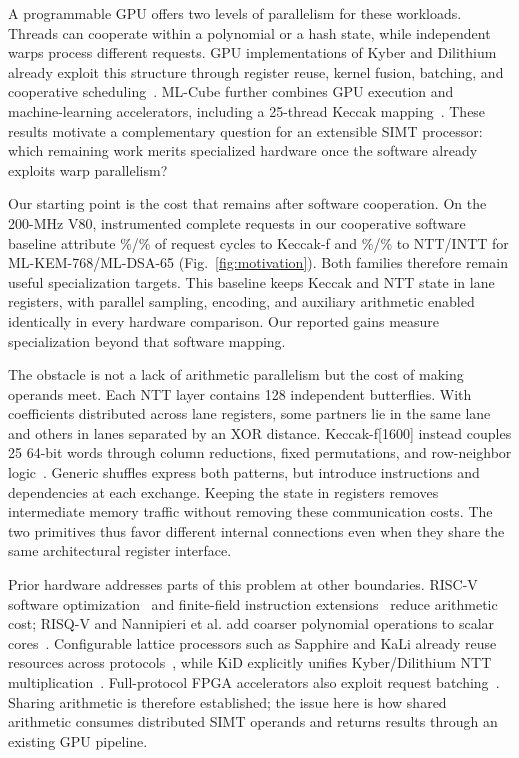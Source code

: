 \documentclass[conference,letterpaper]{IEEEtran}
\begin{document}
A programmable GPU offers two levels of parallelism for these workloads.
Threads can cooperate within a polynomial or a hash state, while independent
warps process different requests. GPU implementations of Kyber and Dilithium
already exploit this structure through register reuse, kernel fusion,
batching, and cooperative scheduling~\cite{hikyber,cudilithium}. ML-Cube
further combines GPU execution and machine-learning accelerators, including
a 25-thread Keccak mapping~\cite{mlcube}. These results motivate a complementary
question for an extensible SIMT processor: which remaining work merits
specialized hardware once the software already exploits warp parallelism?

Our starting point is the cost that remains after software cooperation.
On the 200-MHz V80, instrumented complete requests in our cooperative
software baseline attribute \MotivationKemKeccak{}\%/\MotivationDsaKeccak{}\%
of request cycles to Keccak-f and \MotivationKemNtt{}\%/\MotivationDsaNtt{}\% to NTT/INTT for
ML-KEM-768/ML-DSA-65 (Fig.~\ref{fig:motivation}). Both families therefore
remain useful specialization targets. This baseline keeps Keccak and NTT
state in lane registers, with parallel sampling, encoding, and auxiliary
arithmetic enabled identically in every hardware comparison. Our reported
gains measure specialization beyond that software mapping.

The obstacle is not a lack of arithmetic parallelism but the cost of making
operands meet. Each NTT layer contains 128 independent butterflies. With
coefficients distributed across lane registers, some partners lie in the same
lane and others in lanes separated by an XOR distance. Keccak-f[1600] instead
couples 25 64-bit words through column reductions, fixed permutations, and
row-neighbor logic~\cite{fips202}. Generic shuffles express both patterns, but
introduce instructions and dependencies at each exchange. Keeping the state
in registers removes intermediate memory traffic without removing these
communication costs. The two primitives thus favor different internal
connections even when they share the same architectural register interface.

Prior hardware addresses parts of this problem at other boundaries.
RISC-V software optimization~\cite{pqrv} and finite-field instruction
extensions~\cite{alkim,bevin} reduce arithmetic cost; RISQ-V and Nannipieri
et al. add coarser polynomial operations to scalar cores~\cite{risqv,nannipieri}.
Configurable lattice processors such as Sapphire and KaLi already reuse
resources across protocols~\cite{sapphire,kali}, while KiD explicitly unifies
Kyber/Dilithium NTT multiplication~\cite{kid}. Full-protocol FPGA accelerators
also exploit request batching~\cite{highvolume}. Sharing arithmetic is therefore
established; the issue here is how shared arithmetic consumes distributed
SIMT operands and returns results through an existing GPU pipeline.
\end{document}
